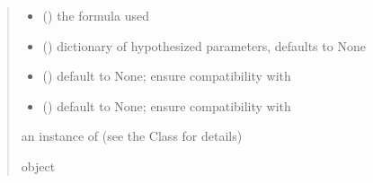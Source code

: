 \documentclass[letterpaper,10pt,english]{sphinxmanual}
\begin{document}
\begin{fulllineitems}
\begin{quote}
\begin{description}
\begin{itemize}
\item {} 
\sphinxAtStartPar
{} () \textendash{} the formula used

\item {} 
\sphinxAtStartPar
{} (\sphinxstyleliteralemphasis{\sphinxupquote{, }}) \textendash{} dictionary of hypothesized parameters, defaults to None

\item {} 
\sphinxAtStartPar
{} () \textendash{} default to None; ensure compatibility with 

\item {} 
\sphinxAtStartPar
{} () \textendash{} default to None; ensure compatibility with 

\end{itemize}

\sphinxAtStartPar
an instance of  (see the Class for details)

\sphinxAtStartPar
object

\end{description}\end{quote}

\end{fulllineitems}

\end{document}
